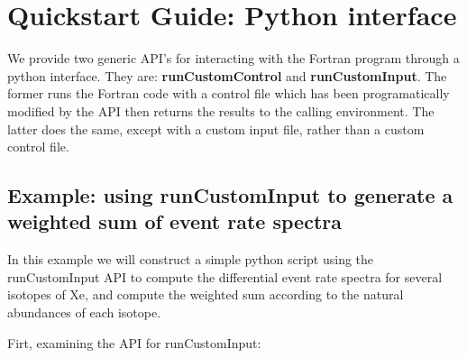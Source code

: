 \documentclass[11pt]{article}
\begin{document}
\clearpage

\section{Quickstart Guide: Python interface}

We provide two generic API's for interacting with the Fortran program through a
python interface. They are: \textbf{runCustomControl} and
\textbf{runCustomInput}. The former runs the Fortran code with a control file
which has been programatically modified by the API then returns the results to
the calling environment. The latter does the same, except with a custom input
file, rather than a custom control file.

\subsection{Example: using runCustomInput to generate a weighted sum of
event rate spectra}

In this example we will construct a simple python script using the 
runCustomInput API to compute the differential
event rate spectra for several isotopes of Xe, and compute the weighted sum
according to the natural abundances of each isotope.

Firt, examining the API for runCustomInput:
\end{document}
